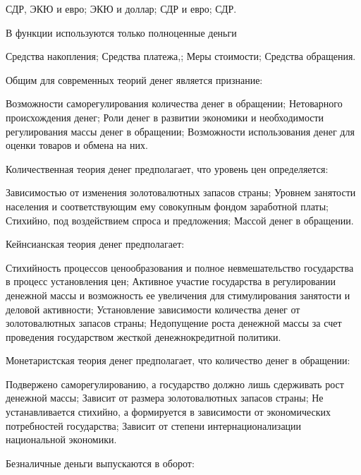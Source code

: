 \documentclass[12pt, table]{exam}
\begin{document}
\begin{questions}
\begin{multicols}{2}
	 \begin{choices}
	 \choice СДР, ЭКЮ и евро;
	 \choice ЭКЮ и доллар;
	 \CC СДР и евро;
	 \choice СДР.
	 \end{choices}
\question В функции  используются только полноценные деньги
	 \begin{choices}
	 \choice Средства накопления;
	 \choice Средства платежа,;
	 \CC Меры стоимости;
	 \choice Средства обращения.
	 \end{choices}
\question Общим для современных теорий денег является признание:
	 \begin{choices}
	 \choice Возможности саморегулирования количества денег в обращении;
	 \CC Нетоварного происхождения денег;
	 \choice Роли денег в развитии экономики и необходимости регулирования массы денег в обращении;
	 \choice Возможности использования денег для оценки товаров и обмена на них.
	 \end{choices}
\question Количественная теория денег предполагает, что уровень цен определяется:
	 \begin{choices}
	 \choice Зависимостью от изменения золотовалютных запасов страны;
	 \CC Уровнем занятости населения и соответствующим ему совокупным фондом заработной платы;
	 \choice Стихийно, под воздействием спроса и предложения;
	 \choice Массой денег в обращении.
	 \end{choices}
\question Кейнсианская теория денег предполагает:
	 \begin{choices}
	 \CC Стихийность процессов ценообразования и полное невмешательство государства в процесс установления цен;
	 \choice Активное участие государства в регулировании денежной массы и возможность ее увеличения для стимулирования занятости и деловой активности;
	 \choice Установление зависимости количества денег от золотовалютных запасов страны;
	 \choice Недопущение роста денежной массы за счет проведения государством жесткой денежнокредитной политики.
	 \end{choices}
\question Монетаристская теория денег предполагает, что количество денег в обращении:
	 \begin{choices}
	 \choice Подвержено саморегулированию, а государство должно лишь сдерживать рост денежной массы;
	 \choice Зависит от размера золотовалютных запасов страны;
	 \choice Не устанавливается стихийно, а формируется в зависимости от экономических потребностей государства;
	 \CC Зависит от степени интернационализации национальной экономики.
	 \end{choices}
\question Безналичные деньги выпускаются в оборот:

\end{multicols}
\end{questions}
\end{document}
